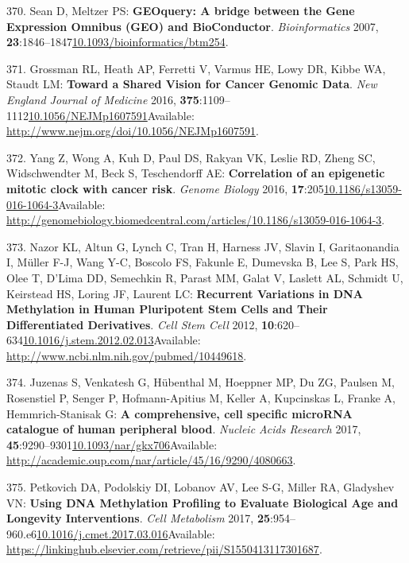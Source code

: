 \documentclass[
]{book}
\begin{document}
\leavevmode\hypertarget{ref-Davis2007p}{}%
370. Sean D, Meltzer PS: \textbf{GEOquery: A bridge between the Gene Expression Omnibus (GEO) and BioConductor}. \emph{Bioinformatics} 2007, \textbf{23}:1846--1847\href{https://doi.org/10.1093/bioinformatics/btm254}{10.1093/bioinformatics/btm254}.

\leavevmode\hypertarget{ref-Grossman2016}{}%
371. Grossman RL, Heath AP, Ferretti V, Varmus HE, Lowy DR, Kibbe WA, Staudt LM: \textbf{Toward a Shared Vision for Cancer Genomic Data}. \emph{New England Journal of Medicine} 2016, \textbf{375}:1109--1112\href{https://doi.org/10.1056/NEJMp1607591}{10.1056/NEJMp1607591}Available: \url{http://www.nejm.org/doi/10.1056/NEJMp1607591}.

\leavevmode\hypertarget{ref-Yang2016}{}%
372. Yang Z, Wong A, Kuh D, Paul DS, Rakyan VK, Leslie RD, Zheng SC, Widschwendter M, Beck S, Teschendorff AE: \textbf{Correlation of an epigenetic mitotic clock with cancer risk}. \emph{Genome Biology} 2016, \textbf{17}:205\href{https://doi.org/10.1186/s13059-016-1064-3}{10.1186/s13059-016-1064-3}Available: \url{http://genomebiology.biomedcentral.com/articles/10.1186/s13059-016-1064-3}.

\leavevmode\hypertarget{ref-Nazor2012}{}%
373. Nazor KL, Altun G, Lynch C, Tran H, Harness JV, Slavin I, Garitaonandia I, Müller F-J, Wang Y-C, Boscolo FS, Fakunle E, Dumevska B, Lee S, Park HS, Olee T, D'Lima DD, Semechkin R, Parast MM, Galat V, Laslett AL, Schmidt U, Keirstead HS, Loring JF, Laurent LC: \textbf{Recurrent Variations in DNA Methylation in Human Pluripotent Stem Cells and Their Differentiated Derivatives}. \emph{Cell Stem Cell} 2012, \textbf{10}:620--634\href{https://doi.org/10.1016/j.stem.2012.02.013}{10.1016/j.stem.2012.02.013}Available: \url{http://www.ncbi.nlm.nih.gov/pubmed/10449618}.

\leavevmode\hypertarget{ref-Juzenas2017}{}%
374. Juzenas S, Venkatesh G, Hübenthal M, Hoeppner MP, Du ZG, Paulsen M, Rosenstiel P, Senger P, Hofmann-Apitius M, Keller A, Kupcinskas L, Franke A, Hemmrich-Stanisak G: \textbf{A comprehensive, cell specific microRNA catalogue of human peripheral blood}. \emph{Nucleic Acids Research} 2017, \textbf{45}:9290--9301\href{https://doi.org/10.1093/nar/gkx706}{10.1093/nar/gkx706}Available: \url{http://academic.oup.com/nar/article/45/16/9290/4080663}.

\leavevmode\hypertarget{ref-Petkovich2017}{}%
375. Petkovich DA, Podolskiy DI, Lobanov AV, Lee S-G, Miller RA, Gladyshev VN: \textbf{Using DNA Methylation Profiling to Evaluate Biological Age and Longevity Interventions}. \emph{Cell Metabolism} 2017, \textbf{25}:954--960.e6\href{https://doi.org/10.1016/j.cmet.2017.03.016}{10.1016/j.cmet.2017.03.016}Available: \url{https://linkinghub.elsevier.com/retrieve/pii/S1550413117301687}.
\end{document}
